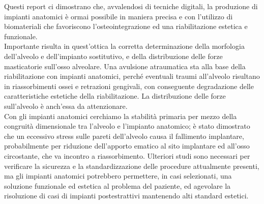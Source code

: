 Questi report ci dimostrano che, avvalendosi di tecniche digitali, la produzione di impianti anatomici è ormai possibile in maniera precisa e con l'utilizzo di biomateriali che favoriscono l'osteointegrazione ed una riabilitazione estetica e funzionale.\\
Importante risulta in quest'ottica la corretta determinazione della morfologia dell'alveolo e dell'impianto sostitutivo, e della distribuzione delle forze masticatorie sull'osso alveolare. Una avulsione atraumatica sta alla base della riabilitazione con impianti anatomici, perché eventuali traumi all'alveolo risultano in riassorbimenti ossei e retrazioni gengivali, con conseguente degradazione delle caratteristiche estetiche della riabilitazione. La distribuzione delle forze sull'alveolo è anch'essa da attenzionare.\\ Con gli impianti anatomici cerchiamo la stabilità primaria per mezzo della congruità dimensionale tra l'alveolo e l'impianto anatomico; è stato dimostrato che un eccessivo stress sulle pareti dell'alveolo causa il fallimento implantare, probabilmente per riduzione dell'apporto ematico al sito implantare ed all'osso circostante, che va incontro a riassorbimento. Ulteriori studi sono necessari per verificare la sicurezza e la standardizzazione delle procedure attualmente presenti, ma gli impianti anatomici potrebbero permettere, in casi selezionati, una soluzione funzionale ed estetica al problema del paziente, ed agevolare la risoluzione di casi di impianti postestrattivi mantenendo alti standard estetici.

